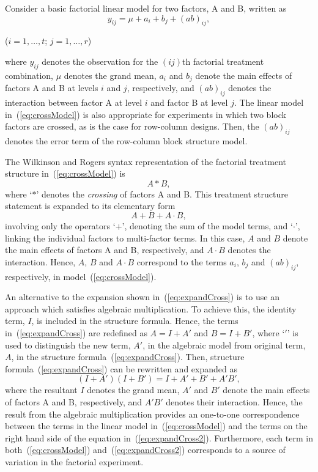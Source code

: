 \documentclass[11pt,a4paper]{article}
\begin{document}
Consider a basic factorial linear model for two factors, A and B, written as
\begin{equation}\label{eq:crossModel}
y_{ij}= \mu + a_{i} + b_{j} + (ab)_{ij},
\end{equation}
\begin{center}
($i=1,\dots ,t$; $j=1,\dots,r$)
\end{center}
where $y_{ij}$ denotes the observation for the $(ij)$th factorial treatment combination, $\mu$ denotes the grand mean, $a_{i}$ and $b_{j}$ denote the main effects of factors A and B at levels $i$ and $j$, respectively, and $(ab)_{ij}$ denotes the interaction between factor A at level $i$ and factor B at level $j$. The linear model in~(\ref{eq:crossModel}) is also appropriate for experiments in which two block factors are crossed, as is the case for row-column designs. Then, the $(ab)_{ij}$ denotes the error term of the row-column block structure model. 

The Wilkinson and Rogers syntax representation of the factorial treatment structure in~(\ref{eq:crossModel}) is
\[
A*B,
\]
where `$*$' denotes the \emph{crossing} of factors A and B. This treatment structure statement is expanded to its elementary form
\begin{equation}\label{eq:expandCross}
A + B +A\cdot B,
\end{equation}
involving only the operators `$+$', denoting the sum of the model terms, and `$\cdot$', linking the individual factors to multi-factor terms. In this case, $A$ and $B$ denote the main effects of factors A and B, respectively, and $A\cdot B$ denotes the interaction. Hence, $A$, $B$ and $A\cdot B$ correspond to the terms $a_{i}$, $b_{j}$ and $(ab)_{ij}$, respectively, in model~(\ref{eq:crossModel}).

An alternative to the expansion shown in~(\ref{eq:expandCross}) is to use an approach which satisfies algebraic multiplication. To achieve this, the identity term, $I$, is included in the structure formula. Hence, the terms in~(\ref{eq:expandCross}) are redefined as $A=I+A'$ and $B=I+B'$, where `$'$' is used to distinguish the new term, $A'$, in the algebraic model from original term, $A$, in the structure formula~(\ref{eq:expandCross}). Then, structure formula~(\ref{eq:expandCross}) can be rewritten and expanded as
\begin{equation}\label{eq:expandCross2}
(I + A')(I + B') = I + A' + B' + A'B',
\end{equation}
where the resultant $I$ denotes the grand mean, $A'$ and $B'$ denote the main effects of factors A and B, respectively, and $A'B'$ denotes their interaction. Hence, the result from the algebraic multiplication provides an one-to-one correspondence between the terms in the linear model in~(\ref{eq:crossModel}) and the terms on the right hand side of the equation in~(\ref{eq:expandCross2}). Furthermore, each term in both~(\ref{eq:crossModel}) and~(\ref{eq:expandCross2}) corresponds to a source of variation in the factorial experiment.
\end{document}
